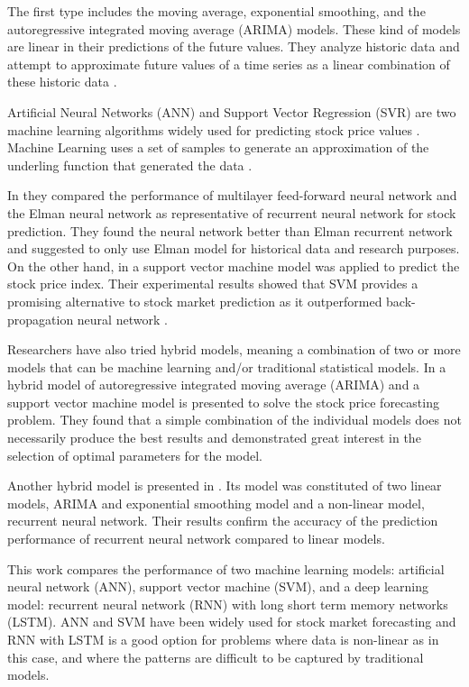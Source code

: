 The first type includes the moving average, exponential smoothing, and the  autoregressive integrated moving average (ARIMA) models. These kind of models are linear in their predictions of the future values. They analyze historic data and attempt to approximate future values of a time series as a linear combination of these historic data \cite{shah2014performance}. 

Artificial Neural Networks (ANN) and Support Vector Regression (SVR) are two machine learning algorithms  widely used for predicting stock price values  \cite{patel2015predicting}. Machine Learning uses a set of samples to generate an approximation of the underling function that generated the data \cite{shah2014performance}.

In \cite{shah2014performance} they compared the performance of multilayer feed-forward neural network and the Elman neural network as representative of recurrent neural network for stock prediction. They found the neural network  better than Elman recurrent network and suggested to only use Elman model for historical data and research purposes. On the other hand, in \cite{kim2003financial} a support vector machine model was applied to predict the stock price index. Their experimental results showed that SVM provides a promising alternative to stock market prediction as it outperformed back-propagation neural network .

Researchers have also tried hybrid models, meaning a combination of two or more models that can be machine learning and/or traditional statistical models. In \cite{pai2005hybrid} a hybrid model of autoregressive integrated moving average (ARIMA) and a support vector machine model is presented to solve the stock price forecasting problem. They found that a simple combination of the individual models does not necessarily produce the best results and demonstrated great interest in the selection of optimal parameters for the model.

Another hybrid model is presented in \cite{rather2015recurrent}. Its model was constituted of two linear models,  ARIMA and exponential smoothing model and a non-linear model, recurrent neural network. Their results confirm the accuracy of the prediction performance of recurrent neural network compared to linear models.

This work compares the performance of two machine learning models: artificial neural network (ANN), support vector machine (SVM),  and a deep learning model: recurrent neural network (RNN) with long short term memory networks (LSTM). ANN and SVM have been widely used for stock market forecasting and RNN with LSTM is a good option for problems where data is non-linear  as in this case, and where the patterns are difficult to be captured by traditional models.

